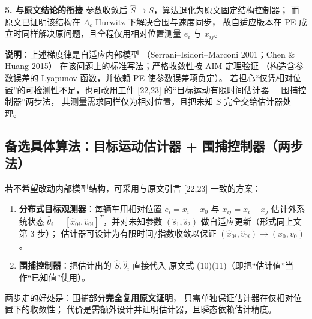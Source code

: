 \medskip
\textbf{5. 与原文结论的衔接}
参数收敛后 $\hat S\to S$，算法退化为原文固定结构控制器；
而原文已证明该结构在 $A_c$ Hurwitz 下解决合围与速度同步，
故自适应版本在 PE 成立时同样解决原问题，且全程仅用相对位置测量
$e_i$ 与 $x_{ij}$。

\medskip
\textbf{说明}：上述梯度律是自适应内部模型
（Serrani--Isidori--Marconi 2001；Chen \& Huang 2015）
在该问题上的标准写法；严格收敛性按 AIM 定理验证
（构造含参数误差的 Lyapunov 函数，并依赖 PE 使参数误差项负定）。
若担心“仅凭相对位置”的可检测性不足，也可改用工件 [22,23]
的“目标运动有限时间估计器 + 围捕控制器”两步法，
其测量需求同样仅为相对位置，且把未知 $S$ 完全交给估计器处理。

\subsection{备选具体算法：目标运动估计器 + 围捕控制器（两步法）}

若不希望改动内部模型结构，可采用与原文引言 [22,23] 一致的方案：
\begin{enumerate}
  \item \textbf{分布式目标观测器}：每辆车用相对位置
    $e_i=x_i-x_0$ 与 $x_{ij}=x_i-x_j$ 估计外系统状态
    $\hat\theta_i=[\hat x_{0i},\hat v_{0i}]^T$，并对未知参数
    $(\hat s_1,\hat s_2)$ 做自适应更新（形式同上文第 3 步）；
    估计器可设计为有限时间/指数收敛以保证 $(\hat x_{0i},\hat v_{0i})\to(x_0,v_0)$。
  \item \textbf{围捕控制器}：把估计出的 $\hat S,\hat\theta_i$ 直接代入
    原文式 (10)(11)（即把“估计值”当作“已知值”使用）。
\end{enumerate}
两步走的好处是：围捕部分\textbf{完全复用原文证明}，
只需单独保证估计器在仅相对位置下的收敛性；
代价是需额外设计并证明估计器，且瞬态依赖估计精度。

